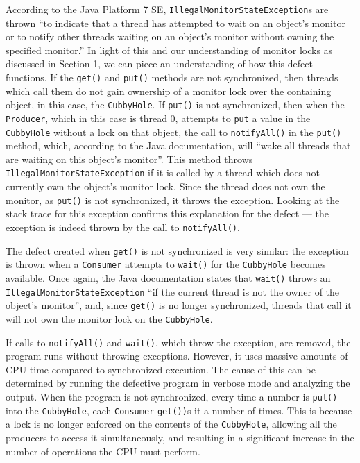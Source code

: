 \documentclass[12pt,a4paper]{article}
\begin{document}
	According to the Java Platform 7 SE, \allowbreak\texttt{IllegalMonitorStateException}s are thrown ``to indicate that a thread has attempted to wait on an object's monitor or to notify other threads waiting on an object's monitor without owning the specified monitor.'' In light of this and our understanding of monitor locks as discussed in Section 1, we can piece an understanding of how this defect functions. If the \texttt{get()} and \texttt{put()} methods are not synchronized, then threads which call them do not gain ownership of a monitor lock over the containing object, in this case, the \texttt{CubbyHole}. If \texttt{put()} is not synchronized, then when the \texttt{Producer}, which in this case is thread 0, attempts to \texttt{put} a value in the \texttt{CubbyHole} without a lock on that object, the call to \texttt{notifyAll()} in the \texttt{put()} method, which, according to the Java documentation, will ``wake all threads that are waiting on this object's monitor''. This method throws \allowbreak\texttt{IllegalMonitorStateException} if it is called by a thread which does not currently own the object's monitor lock. Since the thread does not own the monitor, as \texttt{put()} is not synchronized, it throws the exception. Looking at the stack trace for this exception confirms this explanation for the defect --- the exception is indeed thrown by the call to \texttt{notifyAll()}.

	The defect created when \texttt{get()} is not synchronized is very similar: the exception is thrown when a \texttt{Consumer} attempts to \texttt{wait()} for the \texttt{CubbyHole} becomes available. Once again, the Java documentation states that \texttt{wait()} throws an \allowbreak\texttt{IllegalMonitorStateException} ``if the current thread is not the owner of the object's monitor'', and, since \texttt{get()} is no longer synchronized, threads that call it will not own the monitor lock on the \texttt{CubbyHole}.

	If calls to \texttt{notifyAll()} and \texttt{wait()}, which throw the exception, are removed, the program runs without throwing exceptions. However, it uses massive amounts of CPU time compared to synchronized execution. The cause of this can be determined by running the defective program in verbose mode and analyzing the output. When the program is not synchronized, every time a number is \texttt{put()} into the \texttt{CubbyHole}, each \texttt{Consumer} \texttt{get())}s it a number of times. This is because a lock is no longer enforced on the contents of the \texttt{CubbyHole}, allowing all the producers to access it simultaneously, and resulting in a significant increase in the number of operations the CPU must perform.
\end{document}
